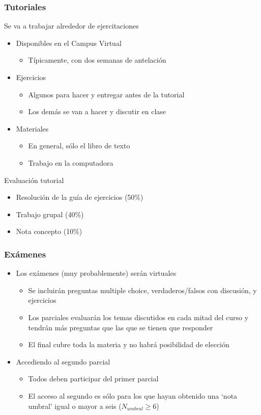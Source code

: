 \documentclass[14pt]{beamer}
\begin{document}
\begin{frame}
\frametitle{Tutoriales}
Se va a trabajar alrededor de ejercitaciones \begin{itemize}
    \item Disponibles en el Campus Virtual
    \begin{itemize}
            \item Típicamente, con dos semanas de antelación
        \end{itemize}
    \item Ejercicios
        \begin{itemize}
            \item Algunos para hacer y entregar antes de la tutorial
            \item Los demás se van a hacer y discutir en clase
        \end{itemize}
    \item Materiales
        \begin{itemize}
            \item En general, sólo el libro de texto
            \item Trabajo en la computadora
        \end{itemize}
\end{itemize} 
    \vspace{2mm}
Evaluación tutorial 
\begin{itemize} 
        \item Resolución de la guía de ejercicios (50\%)
        \item Trabajo grupal (40\%)
        \item Nota concepto (10\%)
    \end{itemize}   
\end{frame}

\begin{frame}
\frametitle{Exámenes}
\begin{itemize}
    \item Los exámenes (muy probablemente) serán virtuales
        \begin{itemize}
            \item Se incluirán preguntas multiple choice, verdaderos/falsos con discusión, y ejercicios
            \item Los parciales evaluarán los temas discutidos en cada mitad del curso y tendrán más preguntas que las que se tienen que responder
            \item El final cubre toda la materia y no habrá posibilidad de elección
        \end{itemize}
    \item Accediendo al segundo parcial
        \begin{itemize}
            \item Todos deben participar del primer parcial
            \item El acceso al segundo es sólo para los que hayan obtenido una ‘nota umbral’ igual o mayor a seis ($N_{umbral} \geq 6$)
        \end{itemize}
\end{itemize}
\end{frame}
\end{document}
